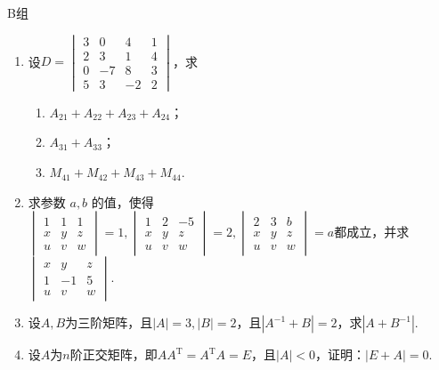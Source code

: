 \centerline{\heiti B组}
\begin{enumerate}
    \item 设$D=\begin{vmatrix}
                  3 & 0 & 4 & 1 \\ 2 & 3 & 1 & 4 \\ 0 & -7 & 8 & 3 \\ 5 & 3 & -2 & 2
              \end{vmatrix}$，求
          \begin{enumerate}
              \item $A_{21}+A_{22}+A_{23}+A_{24}$；

              \item $A_{31}+A_{33}$；

              \item $M_{41}+M_{42}+M_{43}+M_{44}$.
          \end{enumerate}

    \item 求参数 $a,b$  的值，使得$\begin{vmatrix}1 & 1 & 1 \\ x & y & z \\u & v & w\end{vmatrix}=1,
              \begin{vmatrix}1 & 2 & -5 \\ x & y & z \\u & v & w\end{vmatrix}=2,
              \begin{vmatrix}2 & 3 & b \\ x & y & z \\u & v & w\end{vmatrix}=a$都成立，并求$\begin{vmatrix}x & y & z \\ 1 & -1 & 5 \\u & v & w\end{vmatrix}$.

    \item 设$A,B$为三阶矩阵，且$|A|=3,|B|=2$，且$|A^{-1}+B|=2$，求$|A+B^{-1}|$.

    \item 设$A$为$n$阶正交矩阵，即$AA^\mathrm{T}=A^\mathrm{T}A=E$，且$|A|<0$，证明：$|E+A|=0$.


\end{enumerate}
